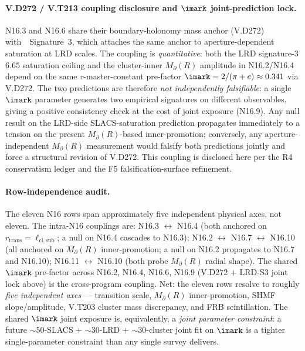 \documentclass{pantarhei-researchnote}
\newcommand{\ellsub}{\ell_{\mathrm{cl},\mathrm{sub}}}  %
\newcommand{\Mpa}{M_{\partial}}                 %
\newcommand{\rtran}{r_{\mathrm{trans}}}
\newcommand{\falsifierID}[1]{\textsc{N16.#1}}
\begin{document}
\paragraph{V.D272 / V.T213 coupling disclosure and $\imark$ joint-prediction lock.}
\falsifierID{3} and \falsifierID{6} share their boundary-holonomy mass
anchor (V.D272) with~\cite{LRDCategoricalv33}~Signature~3, which
attaches the same anchor to aperture-dependent saturation at LRD scales.
The coupling is \emph{quantitative}: both the LRD signature-3 $6.65$
saturation ceiling and the cluster-inner $\Mpa(R)$ amplitude in
\falsifierID{2}/\falsifierID{4} depend on the same $\tau$-master-constant
pre-factor $\imark = 2/(\pi+e) \approx 0.341$ via V.D272. The two predictions
are therefore \emph{not independently falsifiable}: a single $\imark$
parameter generates two empirical signatures on different observables,
giving a positive consistency check at the cost of joint exposure
(\falsifierID{9}). Any null result on the LRD-side SLACS-saturation
prediction propagates immediately to a tension on the present
$\Mpa(R)$-based inner-promotion; conversely, any aperture-independent
$\Mpa(R)$ measurement would falsify both predictions jointly and force
a structural revision of V.D272. This coupling is disclosed here per
the R4 conservatism ledger and the F5 falsification-surface refinement.

\paragraph{Row-independence audit.}
The eleven N16 rows span approximately five independent physical axes,
not eleven. The intra-N16 couplings are: \falsifierID{3} $\leftrightarrow$
\falsifierID{4} (both anchored on $\rtran = \ellsub$; a null on
\falsifierID{4} cascades to \falsifierID{3}); \falsifierID{2}
$\leftrightarrow$ \falsifierID{7} $\leftrightarrow$ \falsifierID{10}
(all anchored on $\Mpa(R)$ inner-promotion; a null on \falsifierID{2}
propagates to \falsifierID{7} and \falsifierID{10}); \falsifierID{11}
$\leftrightarrow$ \falsifierID{10} (both probe $\Mpa(R)$ radial shape).
The shared $\imark$ pre-factor across \falsifierID{2}, \falsifierID{4},
\falsifierID{6}, \falsifierID{9} (V.D272 + LRD-S3 joint lock above) is
the cross-program coupling. Net: the eleven rows resolve to roughly
\emph{five independent axes} — transition scale, $\Mpa(R)$ inner-promotion,
SHMF slope/amplitude, V.T203 cluster mass discrepancy, and FRB
scintillation. The shared $\imark$ joint exposure is, equivalently, a
\emph{joint parameter constraint}: a future $\sim 50$-SLACS +
$\sim 30$-LRD + $\sim 30$-cluster joint fit on $\imark$ is a tighter
single-parameter constraint than any single survey delivers.
\end{document}
